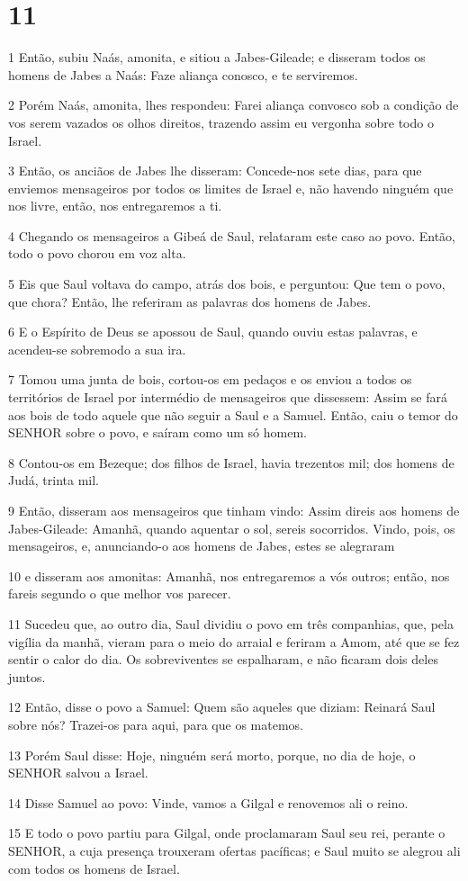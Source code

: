 \chapter{11}

\par 1 Então, subiu Naás, amonita, e sitiou a Jabes-Gileade; e disseram todos os homens de Jabes a Naás: Faze aliança conosco, e te serviremos.
\par 2 Porém Naás, amonita, lhes respondeu: Farei aliança convosco sob a condição de vos serem vazados os olhos direitos, trazendo assim eu vergonha sobre todo o Israel.
\par 3 Então, os anciãos de Jabes lhe disseram: Concede-nos sete dias, para que enviemos mensageiros por todos os limites de Israel e, não havendo ninguém que nos livre, então, nos entregaremos a ti.
\par 4 Chegando os mensageiros a Gibeá de Saul, relataram este caso ao povo. Então, todo o povo chorou em voz alta.
\par 5 Eis que Saul voltava do campo, atrás dos bois, e perguntou: Que tem o povo, que chora? Então, lhe referiram as palavras dos homens de Jabes.
\par 6 E o Espírito de Deus se apossou de Saul, quando ouviu estas palavras, e acendeu-se sobremodo a sua ira.
\par 7 Tomou uma junta de bois, cortou-os em pedaços e os enviou a todos os territórios de Israel por intermédio de mensageiros que dissessem: Assim se fará aos bois de todo aquele que não seguir a Saul e a Samuel. Então, caiu o temor do SENHOR sobre o povo, e saíram como um só homem.
\par 8 Contou-os em Bezeque; dos filhos de Israel, havia trezentos mil; dos homens de Judá, trinta mil.
\par 9 Então, disseram aos mensageiros que tinham vindo: Assim direis aos homens de Jabes-Gileade: Amanhã, quando aquentar o sol, sereis socorridos. Vindo, pois, os mensageiros, e, anunciando-o aos homens de Jabes, estes se alegraram
\par 10 e disseram aos amonitas: Amanhã, nos entregaremos a vós outros; então, nos fareis segundo o que melhor vos parecer.
\par 11 Sucedeu que, ao outro dia, Saul dividiu o povo em três companhias, que, pela vigília da manhã, vieram para o meio do arraial e feriram a Amom, até que se fez sentir o calor do dia. Os sobreviventes se espalharam, e não ficaram dois deles juntos.
\par 12 Então, disse o povo a Samuel: Quem são aqueles que diziam: Reinará Saul sobre nós? Trazei-os para aqui, para que os matemos.
\par 13 Porém Saul disse: Hoje, ninguém será morto, porque, no dia de hoje, o SENHOR salvou a Israel.
\par 14 Disse Samuel ao povo: Vinde, vamos a Gilgal e renovemos ali o reino.
\par 15 E todo o povo partiu para Gilgal, onde proclamaram Saul seu rei, perante o SENHOR, a cuja presença trouxeram ofertas pacíficas; e Saul muito se alegrou ali com todos os homens de Israel.

